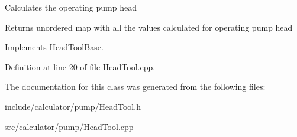 Calculates the operating pump head \begin{DoxyReturn}{Returns}
unordered map with all the values calculated for operating pump head 
\end{DoxyReturn}


Implements \hyperlink{class_head_tool_base_ab8df8f908827ce45dc5e769ea0e10f0b}{Head\+Tool\+Base}.



Definition at line 20 of file Head\+Tool.\+cpp.



The documentation for this class was generated from the following files\+:\begin{DoxyCompactItemize}
\item 
include/calculator/pump/Head\+Tool.\+h\item 
src/calculator/pump/Head\+Tool.\+cpp\end{DoxyCompactItemize}

